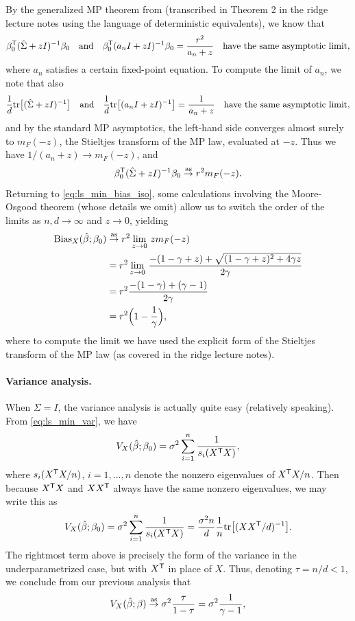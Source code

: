\documentclass{article}
\begin{document}
By the generalized MP theorem from \citet{rubio2011spectral} (transcribed in
Theorem 2 in the ridge lecture notes using the language of deterministic
equivalents), we know that  
\[
\beta_0^{\mathsf{T}} (\hat\Sigma + zI)^{-1} \beta_0 \quad \text{and} \quad 
\beta_0^{\mathsf{T}} (a_n I + zI)^{-1} \beta_0 = \frac{r^2}{a_n + z} \quad
\text{have the same asymptotic limit},
\]
where $a_n$ satisfies a certain fixed-point equation. To compute the limit of
$a_n$, we note that also
\[
\frac{1}{d} \mathrm{tr} \big[ (\hat\Sigma + zI)^{-1} \big] \quad \text{and} \quad 
\frac{1}{d} \mathrm{tr} \big[ (a_n I + zI)^{-1} \big] = \frac{1}{a_n + z}
\quad \text{have the same asymptotic limit},  
\]
and by the standard MP asymptotics, the left-hand side converges almost surely
to $m_F(-z)$, the Stieltjes transform of the MP law, evaluated at $-z$. Thus we
have $1/(a_n + z) \to m_F(-z)$, and   
\[
\beta_0^{\mathsf{T}} (\hat\Sigma + zI)^{-1} \beta_0 \overset{\mathrm{as}}{\to} r^2 m_F(-z).
\]
Returning to \eqref{eq:ls_min_bias_iso}, some calculations involving the
Moore-Osgood theorem (whose details we omit) allow us to switch the order of the
limits as $n,d \to \infty$ and $z \to 0$, yielding
\begin{align}
\nonumber
\mathrm{Bias}_X(\hat{\beta}; \beta_0) &\overset{\mathrm{as}}{\to} r^2 \lim_{z \to 0} \, z m_F(-z) \\
\nonumber
&= r^2 \lim_{z \to 0} \, \frac{-(1 - \gamma + z) + \sqrt{(1 - \gamma + z)^2 +
  4 \gamma z}}{2 \gamma} \\
\nonumber
&= r^2 \frac{-(1-\gamma) + (\gamma-1)}{2 \gamma} \\
\label{eq:ls_min_bias_iso_limit}
&= r^2 \Big( 1- \frac{1}{\gamma} \Big),
\end{align}
where to compute the limit we have used the explicit form of the Stieltjes
transform of the MP law (as covered in the ridge lecture notes).

\paragraph{Variance analysis.}

When $\Sigma = I$, the variance analysis is actually quite easy (relatively
speaking). From \eqref{eq:ls_min_var}, we have
\[
V_X(\hat{\beta}; \beta_0) = \sigma^2 \sum_{i=1}^n \frac{1}{s_i(X^{\mathsf{T}} X)},
\]
where $s_i(X^{\mathsf{T}} X/n)$, $i=1,\dots,n$ denote the nonzero eigenvalues of $X^{\mathsf{T}} 
X/n$. Then because $X^{\mathsf{T}} X$ and $XX^{\mathsf{T}}$ always have the same nonzero
eigenvalues, we may write this as
\[
V_X(\hat{\beta}; \beta_0) = \sigma^2 \sum_{i=1}^n \frac{1}{s_i(X^{\mathsf{T}} X)} = 
\frac{\sigma^2 n}{d} \frac{1}{n} \mathrm{tr}\big[ (XX^{\mathsf{T}} /d)^{-1} \big].
\]
The rightmost term above is precisely the form of the variance in the
underparametrized case, but with $X^{\mathsf{T}}$ in place of $X$. Thus, denoting $\tau =
n/d < 1$, we conclude from our previous analysis that  
\begin{equation}
\label{eq:ls_min_var_iso_limit}
V_X(\hat{\beta}; \beta) \overset{\mathrm{as}}{\to} \sigma^2 \frac{\tau}{1-\tau} = \sigma^2 
\frac{1}{\gamma-1},  
\end{equation}
\end{document}
